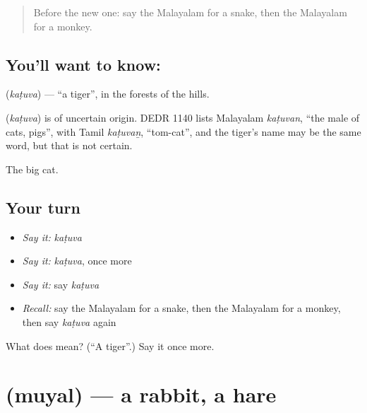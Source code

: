 \label{lesson:ML-C138-tiger}



\begin{quote}
Before the new one: say the Malayalam for a snake, then the Malayalam for a monkey.
\end{quote}

\subsection*{You'll want to know: }
\textbf{} (\emph{kaṭuva}) — \textquotedblleft{}a tiger\textquotedblright{}, in the forests of the hills.

\begin{cousinweb}
\textbf{} (\emph{kaṭuva}) is of uncertain origin. DEDR 1140 lists Malayalam \emph{kaṭuvan}, \textquotedblleft{}the male of cats, pigs\textquotedblright{}, with Tamil \emph{kaṭuvaṉ}, \textquotedblleft{}tom-cat\textquotedblright{}, and the tiger's name may be the same word, but that is not certain.
\end{cousinweb}

\begin{grammarlens}[title={What you've built}]
The big cat.
\end{grammarlens}

\subsection*{Your turn}
\begin{itemize}
\raggedright
  \item \emph{Say it:} \emph{kaṭuva}
  \item \emph{Say it:} \emph{kaṭuva}, once more
  \item \emph{Say it:} say \emph{kaṭuva}
  \item \emph{Recall:} say the Malayalam for a snake, then the Malayalam for a monkey, then say \emph{kaṭuva} again
\end{itemize}

\begin{tcolorbox}[breakable,colback=teal!4,colframe=teal!35!black,title={Before you move on}]
What does  mean? (\textquotedblleft{}A tiger\textquotedblright{}.) Say it once more.
\end{tcolorbox}
\section[\texorpdfstring{\ml{മുയൽ} (muyal)}{മുയൽ (muyal)}]{ (muyal) — a rabbit, a hare}

